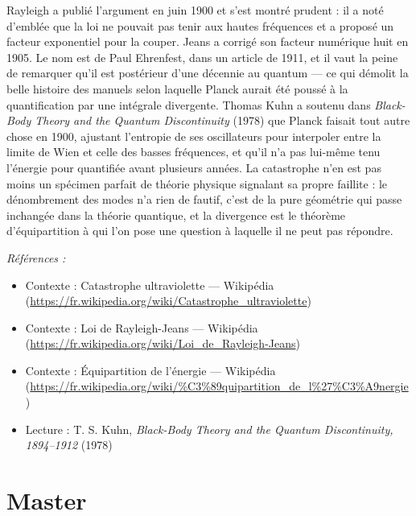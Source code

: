 \documentclass[11pt]{article}
\newenvironment{refs}{\par\small\noindent\emph{Références :}\begin{itemize}\setlength\itemsep{0pt}}{\end{itemize}\normalsize}
\begin{document}
\noindent Rayleigh a publié l'argument en juin 1900 et s'est montré prudent : il a noté
d'emblée que la loi ne pouvait pas tenir aux hautes fréquences et a proposé un facteur exponentiel
pour la couper. Jeans a corrigé son facteur numérique huit en 1905. Le nom est de Paul Ehrenfest,
dans un article de 1911, et il vaut la peine de remarquer qu'il est postérieur d'une décennie au
quantum --- ce qui démolit la belle histoire des manuels selon laquelle Planck aurait été poussé à
la quantification par une intégrale divergente. Thomas Kuhn a soutenu dans \textit{Black-Body Theory
and the Quantum Discontinuity} (1978) que Planck faisait tout autre chose en 1900, ajustant
l'entropie de ses oscillateurs pour interpoler entre la limite de Wien et celle des basses
fréquences, et qu'il n'a pas lui-même tenu l'énergie pour quantifiée avant plusieurs années. La
catastrophe n'en est pas moins un spécimen parfait de théorie physique signalant sa propre
faillite : le dénombrement des modes n'a rien de fautif, c'est de la pure géométrie qui passe
inchangée dans la théorie quantique, et la divergence est le théorème d'équipartition à qui l'on
pose une question à laquelle il ne peut pas répondre.

\begin{refs}
\item Contexte : Catastrophe ultraviolette --- Wikipédia (\url{https://fr.wikipedia.org/wiki/Catastrophe_ultraviolette})
\item Contexte : Loi de Rayleigh-Jeans --- Wikipédia (\url{https://fr.wikipedia.org/wiki/Loi_de_Rayleigh-Jeans})
\item Contexte : Équipartition de l'énergie --- Wikipédia (\url{https://fr.wikipedia.org/wiki/%C3%89quipartition_de_l%27%C3%A9nergie})
\item Lecture : T. S. Kuhn, \textit{Black-Body Theory and the Quantum Discontinuity, 1894--1912} (1978)
\end{refs}

\bigskip


\section*{Master}
\end{document}
